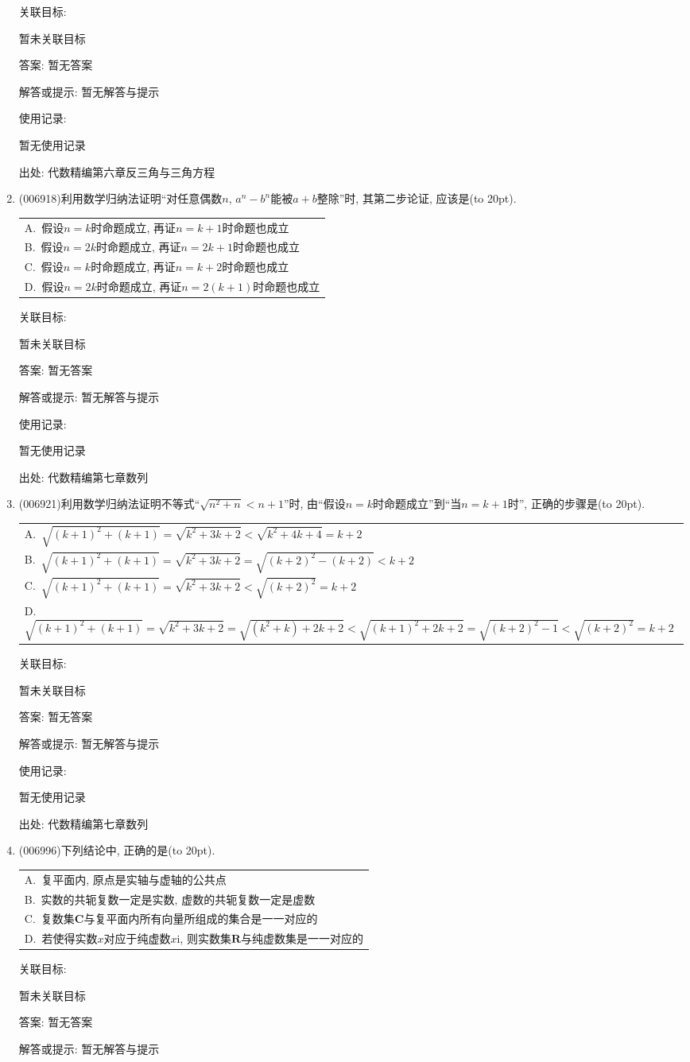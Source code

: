 \documentclass[10pt,a4paper]{article}
\newcommand{\bracket}[1]{(\hbox to #1pt{})}
\newcommand{\onech}[4]{\par\begin{tabular}{p{.9\textwidth}}
A.~#1\\
B.~#2\\
C.~#3\\
D.~#4
\end{tabular}}
\begin{document}
\begin{enumerate}[1.]
关联目标:

暂未关联目标

答案: 暂无答案

解答或提示: 暂无解答与提示

使用记录:

暂无使用记录


出处: 代数精编第六章反三角与三角方程
\item { (006918)}利用数学归纳法证明``对任意偶数$n$, $a^n-b^n$能被$a+b$整除''时, 其第二步论证, 应该是\bracket{20}.
\onech{假设$n=k$时命题成立, 再证$n=k+1$时命题也成立}{假设$n=2k$时命题成立, 再证$n=2k+1$时命题也成立}{假设$n=k$时命题成立, 再证$n=k+2$时命题也成立}{假设$n=2k$时命题成立, 再证$n=2(k+1)$时命题也成立}


关联目标:

暂未关联目标

答案: 暂无答案

解答或提示: 暂无解答与提示

使用记录:

暂无使用记录


出处: 代数精编第七章数列
\item { (006921)}利用数学归纳法证明不等式``$\sqrt {n^2+n}<n+1$''时, 由``假设$n=k$时命题成立''到``当$n=k+1$时'', 正确的步骤是\bracket{20}.
\onech{$\sqrt {(k+1)^2+(k+1)}=\sqrt {k^2+3k+2}<\sqrt {k^2+4k+4}=k+2$}{$\sqrt {(k+1)^2+(k+1)}=\sqrt {k^2+3k+2}=\sqrt {(k+2)^2-(k+2)}<k+2$}{$\sqrt {(k+1)^2+(k+1)}=\sqrt {k^2+3k+2}<\sqrt {(k+2)^2}=k+2$}{$\sqrt {(k+1)^2+(k+1)}=\sqrt {k^2+3k+2}=\sqrt {(k^2+k)+2k+2}<\sqrt {(k+1)^2+2k+2}=\sqrt {(k+2)^2-1}<\sqrt {(k+2)^2}=k+2$}


关联目标:

暂未关联目标

答案: 暂无答案

解答或提示: 暂无解答与提示

使用记录:

暂无使用记录


出处: 代数精编第七章数列
\item { (006996)}下列结论中, 正确的是\bracket{20}.
\onech{复平面内, 原点是实轴与虚轴的公共点}{实数的共轭复数一定是实数, 虚数的共轭复数一定是虚数}{复数集$\mathbf{C}$与复平面内所有向量所组成的集合是一一对应的}{若使得实数$x$对应于纯虚数$x\mathrm{i}$, 则实数集$\mathbf{R}$与纯虚数集是一一对应的}


关联目标:

暂未关联目标

答案: 暂无答案

解答或提示: 暂无解答与提示


\end{enumerate}
\end{document}
